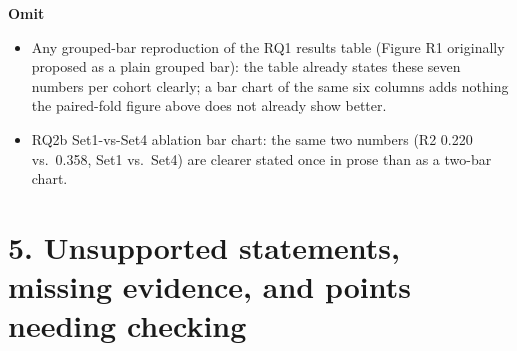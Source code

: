 \documentclass[11pt,a4paper]{report}
\begin{document}
\textbf{Omit}

\begin{itemize}
\item Any grouped-bar reproduction of the RQ1 results table (Figure R1 originally
  proposed as a plain grouped bar): the table already states these seven numbers per
  cohort clearly; a bar chart of the same six columns adds nothing the paired-fold
  figure above does not already show better.
\item RQ2b Set1-vs-Set4 ablation bar chart: the same two numbers (R2 0.220 vs.\ 0.358,
  Set1 vs.\ Set4) are clearer stated once in prose than as a two-bar chart.
\end{itemize}

\section*{5. Unsupported statements, missing evidence, and points needing checking}
\end{document}
